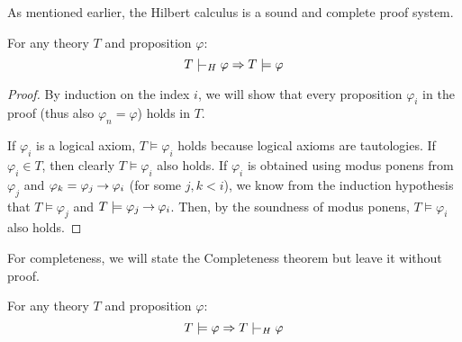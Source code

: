 As mentioned earlier, the Hilbert calculus is a sound and complete proof system.

\begin{theorem}
For any theory $T$ and proposition $\varphi$:
$$
T \proves_H \varphi \Rightarrow T \models \varphi
$$ 
\end{theorem}
\begin{proof}
By induction on the index $i$, we will show that every proposition $\varphi_i$ in the proof (thus also $\varphi_n = \varphi$) holds in $T$.

If $\varphi_i$ is a logical axiom, $T \models \varphi_i$ holds because logical axioms are tautologies. If $\varphi_i \in T$, then clearly $T \models \varphi_i$ also holds. If $\varphi_i$ is obtained using modus ponens from $\varphi_j$ and $\varphi_k = \varphi_j \mathbin{\rightarrow} \varphi_i$ (for some $j, k < i$), we know from the induction hypothesis that $T \models \varphi_j$ and $T \models \varphi_j \mathbin{\rightarrow} \varphi_i$. Then, by the soundness of modus ponens, $T \models \varphi_i$ also holds.
\end{proof}

For completeness, we will state the Completeness theorem but leave it without proof.

\begin{theorem}
For any theory $T$ and proposition $\varphi$: 
$$
T \models \varphi \Rightarrow T \proves_H \varphi
$$
\end{theorem}
